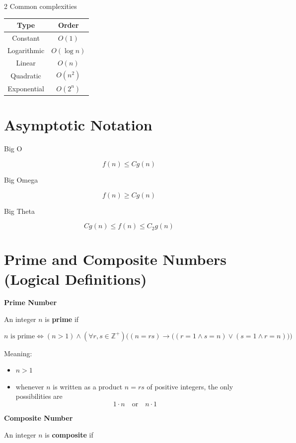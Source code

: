 \documentclass[9pt]{article}
\begin{document}
\begin{multicols}{2}
Common complexities

\begin{tabular}{c|c}
Type & Order\\
\hline
Constant & $O(1)$\\
Logarithmic & $O(\log n)$\\
Linear & $O(n)$\\
Quadratic & $O(n^2)$\\
Exponential & $O(2^n)$
\end{tabular}

\section*{Asymptotic Notation}

Big O

\[
f(n)\le Cg(n)
\]

Big Omega

\[
f(n)\ge Cg(n)
\]

Big Theta

\[
Cg(n)\le f(n)\le C_2g(n)
\]


\section*{Prime and Composite Numbers (Logical Definitions)}

\textbf{Prime Number}

An integer $n$ is \textbf{prime} if

\[
n \text{ is prime} \iff (n>1) \land 
(\forall r,s \in \mathbb{Z}^+)
\Big((n = rs) \rightarrow 
\big((r = 1 \land s = n) \lor (s = 1 \land r = n)\big)\Big)
\]

Meaning:

\begin{itemize}
\item $n>1$
\item whenever $n$ is written as a product $n = rs$ of positive integers,
the only possibilities are
\[
1\cdot n \quad \text{or} \quad n\cdot 1
\]
\end{itemize}


\textbf{Composite Number}

An integer $n$ is \textbf{composite} if


\end{multicols}
\end{document}
